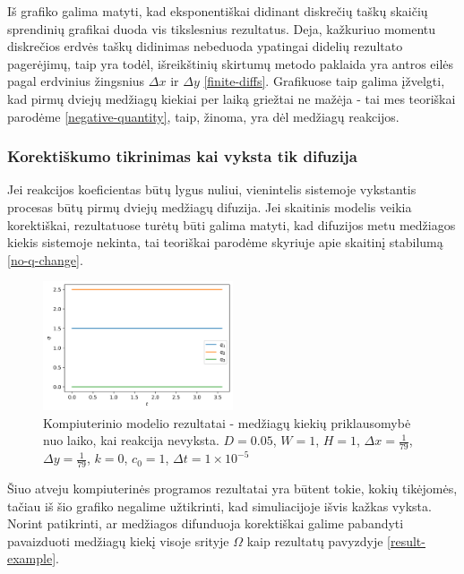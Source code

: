 Iš grafiko galima matyti, kad eksponentiškai didinant diskrečių taškų skaičių sprendinių grafikai duoda vis tikslesnius rezultatus. Deja, kažkuriuo momentu diskrečios erdvės taškų didinimas nebeduoda ypatingai didelių rezultato pagerėjimų, taip yra todėl, išreikštinių skirtumų metodo paklaida yra antros eilės pagal erdvinius žingsnius $\Delta x$ ir $\Delta y$ \eqref{finite-diffs}. Grafikuose taip galima įžvelgti, kad pirmų dviejų medžiagų kiekiai per laiką griežtai ne mažėja - tai mes teoriškai parodėme \eqref{negative-quantity}, taip, žinoma, yra dėl medžiagų reakcijos. 

\newpage

\subsubsection*{Korektiškumo tikrinimas kai vyksta tik difuzija}

Jei reakcijos koeficientas būtų lygus nuliui, vienintelis sistemoje vykstantis procesas būtų pirmų dviejų medžiagų difuzija. Jei skaitinis modelis veikia korektiškai, rezultatuose turėtų būti galima matyti, kad difuzijos metu medžiagos kiekis sistemoje nekinta, tai teoriškai parodėme skyriuje apie skaitinį stabilumą \eqref{no-q-change}.

\begin{figure}[h!]
    \centering
    \includegraphics[width=0.5\textwidth]{../assets/no-reaction.png}
    \caption{Kompiuterinio modelio rezultatai - medžiagų kiekių priklausomybė nuo laiko, kai reakcija nevyksta. $D = 0.05$, $W = 1$, $H = 1$, $\Delta x = \frac{1}{79}$, $\Delta y = \frac{1}{79}$, $k = 0$, $c_0 = 1$, $\Delta t = 1\times 10^{-5}$ }
    \label{no-reaction}
\end{figure}

Šiuo atveju kompiuterinės programos rezultatai yra būtent tokie, kokių tikėjomės, tačiau iš šio grafiko negalime užtikrinti, kad simuliacijoje išvis kažkas vyksta. Norint patikrinti, ar medžiagos difunduoja korektiškai galime pabandyti pavaizduoti medžiagų kiekį visoje srityje $\Omega$ kaip rezultatų pavyzdyje \eqref{result-example}.

